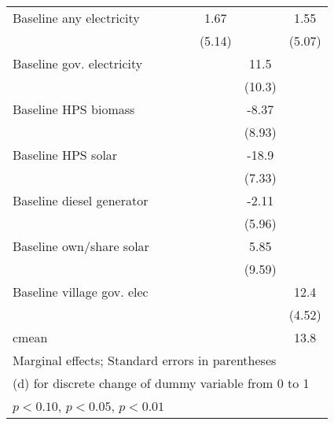 \begin{table}[htbp]
\begin{tabular*}{1\hsize}{@{\hskip\tabcolsep\extracolsep\fill}l*{6}{c}}
Baseline any electricity&                  &                  &                  &     1.67         &                  &     1.55         \\
                &                  &                  &                  &   (5.14)         &                  &   (5.07)         \\
Baseline gov. electricity&                  &                  &                  &                  &     11.5         &                  \\
                &                  &                  &                  &                  &   (10.3)         &                  \\
Baseline HPS biomass&                  &                  &                  &                  &    -8.37         &                  \\
                &                  &                  &                  &                  &   (8.93)         &                  \\
Baseline HPS solar&                  &                  &                  &                  &    -18.9\sym{**} &                  \\
                &                  &                  &                  &                  &   (7.33)         &                  \\
Baseline diesel generator&                  &                  &                  &                  &    -2.11         &                  \\
                &                  &                  &                  &                  &   (5.96)         &                  \\
Baseline own/share solar&                  &                  &                  &                  &     5.85         &                  \\
                &                  &                  &                  &                  &   (9.59)         &                  \\
Baseline village gov. elec&                  &                  &                  &                  &                  &     12.4\sym{***}\\
                &                  &                  &                  &                  &                  &   (4.52)         \\
\midrule
cmean           &                  &                  &                  &                  &                  &     13.8         \\
\bottomrule
\multicolumn{7}{l}{\footnotesize Marginal effects; Standard errors in parentheses}\\
\multicolumn{7}{l}{\footnotesize  (d) for discrete change of dummy variable from 0 to 1}\\
\multicolumn{7}{l}{\footnotesize \sym{*} \(p<0.10\), \sym{**} \(p<0.05\), \sym{***} \(p<0.01\)}\\
\end{tabular*}
\end{table}
